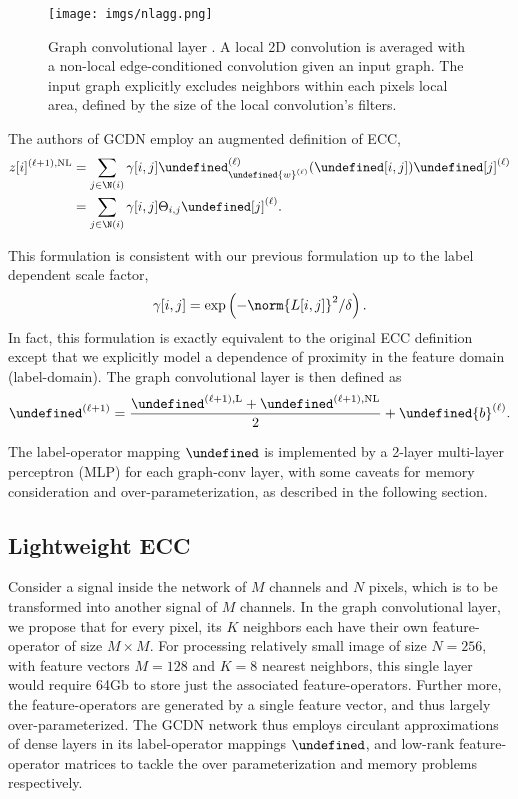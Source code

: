 \documentclass[12pt,a4paper,reqno]{amsart}
\let\bm\undefined
\newcommand{\bm}[1]{\mathbf{#1}}
\let\z\undefined
\newcommand{\z}{\bm{z}}
\let\L\undefined
\newcommand{\L}{\mathcal{L}}
\let\F\undefined
\newcommand{\F}{\mathcal{F}}
\begin{document}
\begin{figure}
\centering
\texttt{[image: imgs/nlagg.png]}
\caption{Graph convolutional layer \cite{ValsesiaICIP19}. A local 2D convolution
is averaged with a non-local edge-conditioned convolution given an input graph.
The input graph explicitly excludes neighbors within each pixels local area,
defined by the size of the local convolution's filters. }
\label{fig:gclayer}
\end{figure}

The authors of GCDN \cite{ValsesiaICIP19} employ an augmented definition of ECC,
\begin{align}
z[i]^{(\ell+1),\mathrm{NL}} &= \sum_{j \in \N(i)} \gamma[i,j]
\F^{(\ell)}_{\bm{w}^{(\ell)}}(\L[i,j])\z[j]^{(\ell)} \\
&= \sum_{j \in \N(i)} \gamma[i,j] \Theta_{i,j}\z[j]^{(\ell)}. 
\end{align}

This formulation is consistent with our previous formulation up to the label
dependent scale factor, 
$$
\gamma[i,j] = \exp\left( - \norm{L[i,j]}^2 / \delta \right).
$$
In fact, this formulation is exactly equivalent to the original ECC definition
except that we explicitly model a dependence of proximity in the feature domain
(label-domain). The graph convolutional layer is then defined as 
\begin{equation}
\z^{(\ell+1)} = \frac{\z^{(\ell+1),\mathrm{L}}+ \z^{(\ell+1),\mathrm{NL}}}{2} +
\bm{b}^{(\ell)}.
\end{equation}

The label-operator mapping $\F$ is implemented by a 2-layer multi-layer
perceptron (MLP) for each graph-conv layer, with some caveats for memory
consideration and over-parameterization, as described in the following section. 

\subsection{Lightweight ECC}
Consider a signal inside the network of $M$ channels and $N$ pixels, which is to
be transformed into another signal of $M$ channels. In the graph convolutional
layer, we propose that for every pixel, its $K$ neighbors each have their own
feature-operator of size $M\times M$. For processing relatively small image of size $N = 256$,
with feature vectors $M=128$ and $K=8$ nearest neighbors, this single layer
would require 64Gb to store just the associated feature-operators. Further more,
the feature-operators are generated by a single feature vector, and thus largely
over-parameterized. The GCDN network thus employs circulant approximations of
dense layers in its label-operator mappings $\F$, and low-rank
feature-operator matrices to tackle the over parameterization and memory
problems respectively.  \\
\end{document}
